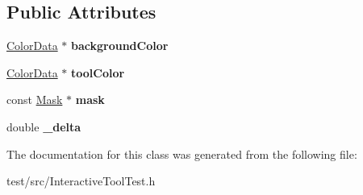 \subsection*{Public Attributes}
\begin{DoxyCompactItemize}
\item 
\hypertarget{classInteractiveToolTest_a788038c82bc29e8600c96575b93be98a}{\hyperlink{classColorData}{Color\-Data} $\ast$ {\bfseries background\-Color}}\label{classInteractiveToolTest_a788038c82bc29e8600c96575b93be98a}

\item 
\hypertarget{classInteractiveToolTest_a67686065ed7d3356a4c47e611401e1bb}{\hyperlink{classColorData}{Color\-Data} $\ast$ {\bfseries tool\-Color}}\label{classInteractiveToolTest_a67686065ed7d3356a4c47e611401e1bb}

\item 
\hypertarget{classInteractiveToolTest_ab54b948737aa2daf322dd5d72f7a2346}{const \hyperlink{classMask}{Mask} $\ast$ {\bfseries mask}}\label{classInteractiveToolTest_ab54b948737aa2daf322dd5d72f7a2346}

\item 
\hypertarget{classInteractiveToolTest_a72482575f072188b284ab5e8885749f5}{double {\bfseries \-\_\-delta}}\label{classInteractiveToolTest_a72482575f072188b284ab5e8885749f5}

\end{DoxyCompactItemize}


The documentation for this class was generated from the following file\-:\begin{DoxyCompactItemize}
\item 
test/src/Interactive\-Tool\-Test.\-h\end{DoxyCompactItemize}
